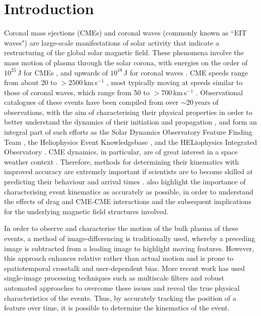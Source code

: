 \documentclass[structabstract]{aa}
\begin{document}
%

\section{Introduction}
\label{sect_intro}

Coronal mass ejections (CMEs) and coronal waves (commonly known as ``EIT waves") are large-scale manifestations of solar activity that indicate a restructuring of the global solar magnetic field. These phenomena involve the mass motion of plasma through the solar corona, with energies on the order of $10^{25}$\,J for CMEs \citep{2004JGRA..10910104E}, and upwards of $10^{18}$\,J for coronal waves \citep{2005ApJ...633L.145B}. CME speeds range from about 20 to $>$$2500$\,km\,s$^{-1}$ \citep{2004JGRA..10907105Y}, most typically moving at speeds similar to those of coronal waves, which range from 50 to $>$$700$\,km\,s$^{-1}$ \citep{2009ApJS..183..225T}. Observational catalogues of these events have been compiled from over $\sim$20\,years of observations, with the aim of characterising their physical properties in order to better understand the dynamics of their initiation and propagation \citep[see some recent reviews by][]{2011ASSL..376.....H, 2011SSRv..158..365G, 2012SoPh..tmp...93P, 2012LRSP....9....3W}, and form an integral part of such efforts as the Solar Dynamics Observatory Feature Finding Team \citep[\emph{SDO} FFT;][]{2012SoPh..275...79M}, the Heliophysics Event Knowledgebase \citep[HEK;][]{2012SoPh..275...67H}, and the HELiophysics Integrated Observatory \citep[HELIO;][]{2011AdSpR..47.2235B} . CME dynamics, in particular, are of great interest in a space weather context \citep[e.g.,][]{2005A&A...440..373H, 2010heliophysics, SWE:SWE493}. Therefore, methods for determining their kinematics with improved accuracy are extremely important if scientists are to become skilled at predicting their behaviour and arrival times \citep[see, for example, efforts by][]{2004Natur.432...78P, 2005AnGeo..23.1033S, 2006ApJ...652.1747C, 2010NatCo...1E..74B}. \citet{2012ApJ...749...57T} also highlight the importance of characterising event kinematics as accurately as possible, in order to understand the effects of drag and CME-CME interactions and the subsequent implications for the underlying magnetic field structures involved.

In order to observe and characterise the motion of the bulk plasma of these events, a method of image-differencing is traditionally used, whereby a preceding image is subtracted from a leading image to highlight moving features. However, this approach enhances relative rather than actual motion and is prone to spatiotemporal crosstalk and user-dependent bias. More recent work has used single-image processing techniques such as multiscale filters \citep{2008SoPh..248..457Y, 2009A&A...495..325B, 2011AdSpR..47.2118G} and robust automated approaches \citep[e.g.,][]{2011A&A...531A..42L, 2012SoPh..276..479P, 2012ApJ...752..145B} to overcome these issues and reveal the true physical characteristics of the events. Thus, by accurately tracking the position of a feature over time, it is possible to determine the kinematics of the event. 
\end{document}
